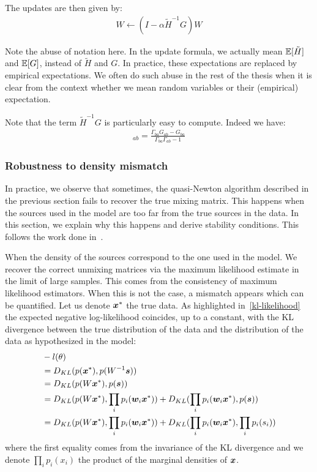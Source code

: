 The updates are then given by:
\begin{align}
  W \leftarrow (I - \alpha \tilde{H}^{-1} G) W
\end{align}

Note the abuse of notation here. In the update formula, we actually mean
$\mathbb{E}[\tilde{H}]$ and $\mathbb{E}[G]$,
instead of $\tilde{H}$ and $G$.
In practice, these expectations are replaced by empirical expectations. We often do such abuse in the rest of the thesis when it is clear from the context whether we mean random variables or their (empirical) expectation. 

Note that the term $\tilde{H}^{-1} G$ is particularly easy to compute. Indeed we
have:
\begin{align}
[\tilde{H}^{-1} G]_{ab} = \frac{\Gamma_{ba} G_{ab} - G_{ba}}{\Gamma_{ba}
  \Gamma_{ab} - 1}
\end{align}

\subsubsection{Robustness to density mismatch}
In practice, we observe that sometimes, the quasi-Newton algorithm described in
the previous section fails to recover the true mixing matrix. This happens when the
sources used in the model are too far from the true sources in the data. In this section, we explain
why this happens and derive stability conditions. This follows the work done in~\cite{cardoso1998blind}.

When the density of the sources correspond to the one used in the model. We
recover the correct unmixing matrices via the maximum likelihood estimate in the
limit of large samples. This comes from the consistency of maximum likelihood
estimators.
When this is not the case, a mismatch appears which can be quantified. Let us
denote $\boldsymbol{x}^*$ the true data. As highlighted in~\eqref{kl-likelihood} the expected
negative log-likelihood coincides, up to a constant, with the KL divergence between the true
distribution of the data and the distribution of the data as hypothesized in the
model:
\begin{align}
  &-l(\theta) \\
  &=  D_{KL}(p(\boldsymbol{x}^*), p(W^{-1} \boldsymbol{s})) \\
             &=  D_{KL}(p(W\boldsymbol{x}^*), p(\boldsymbol{s})) \\
             &=  D_{KL}(p(W \boldsymbol{x}^*), \prod_i p_i(\boldsymbol{w}_i\boldsymbol{x}^*)) + D_{KL}(\prod_i p_i(\boldsymbol{w}_i\boldsymbol{x}^*), p(\boldsymbol{s})) \\
             &=  D_{KL}(p(W \boldsymbol{x}^*), \prod_i p_i(\boldsymbol{w}_i\boldsymbol{x}^*)) + D_{KL}(\prod_i p_i(\boldsymbol{w}_i\boldsymbol{x}^*), \prod_i p_i(s_i)) \\
\end{align}
where the first equality comes from the invariance of the KL divergence and we
denote $\prod_i p_i(x_i)$ the product of the marginal densities of $\boldsymbol{x}$.


